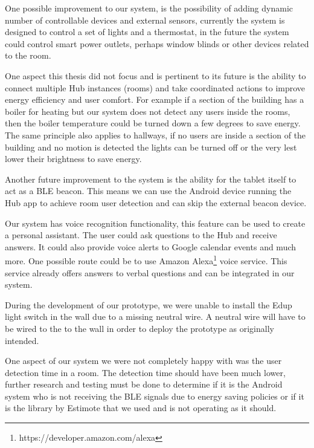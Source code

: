 One possible improvement to our system, is the possibility of adding dynamic number of controllable devices and external sensors, currently the system is designed to control a set of lights and a thermostat, in the future the system could control smart power outlets, perhaps window blinds or other devices related to the room.

One aspect this thesis did not focus and is pertinent to its future is the ability to connect multiple Hub instances (rooms) and take coordinated actions to improve energy efficiency and user comfort. For example if a section of the building has a boiler for heating but our system does not detect any users inside the rooms, then the boiler temperature could be turned down a few degrees to save energy. The same principle also applies to hallways, if no users are inside a section of the building and no motion is detected the lights can be turned off or the very lest lower their brightness to save energy.

Another future improvement to the system is the ability for the tablet itself to act as a \ac{BLE} beacon. This means we can use the Android device running the Hub app to achieve room user detection and can skip the external beacon device.

Our system has voice recognition functionality, this feature can be used to create a personal assistant. The user could ask questions to the Hub and receive answers. It could also provide voice alerts to Google calendar events and much more. One possible route could be to use Amazon Alexa\footnote{https://developer.amazon.com/alexa} voice service. This service already offers answers to verbal questions and can be integrated in our system.

During the development of our prototype, we were unable to install the Edup light switch in the wall due to a missing neutral wire. A neutral wire will have to be wired to the to the wall in order to deploy the prototype as originally intended. 

One aspect of our system we were not completely happy with was the user detection time in a room. The detection time should have been much lower, further research and testing must be done to determine if it is the Android system who is not receiving the BLE signals due to energy saving policies or if it is the library by Estimote that we used and is not operating as it should.


\cleardoublepage
